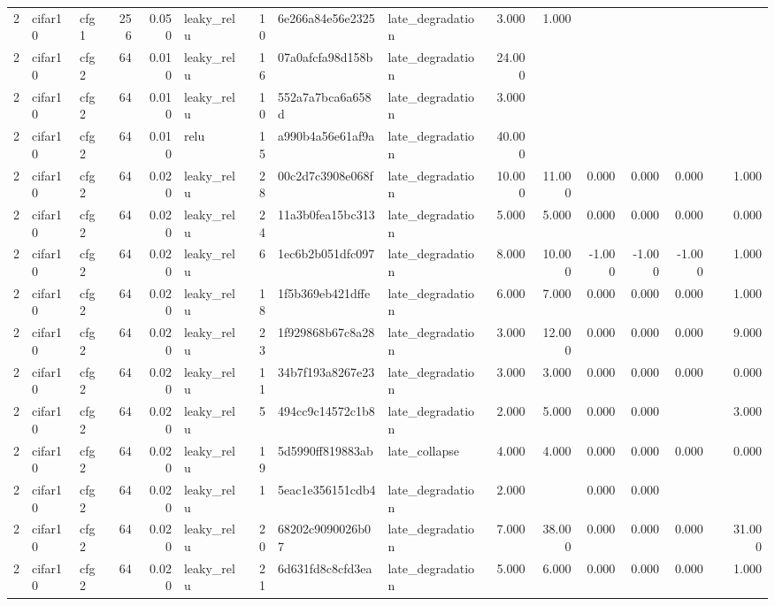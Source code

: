 \begin{table}[htbp]
{\begin{tabular}{@{}rllrrlrllrrrrrrr@{}}
2 & cifar10 & cfg1 & 256 & 0.050 & leaky\_relu & 10 & 6e266a84e56e2325 & late\_degradation & 3.000 & 1.000 &  &  &  &  &  \\
2 & cifar10 & cfg2 & 64 & 0.010 & leaky\_relu & 16 & 07a0afcfa98d158b & late\_degradation & 24.000 &  &  &  &  &  &  \\
2 & cifar10 & cfg2 & 64 & 0.010 & leaky\_relu & 10 & 552a7a7bca6a658d & late\_degradation & 3.000 &  &  &  &  &  &  \\
2 & cifar10 & cfg2 & 64 & 0.010 & relu & 15 & a990b4a56e61af9a & late\_degradation & 40.000 &  &  &  &  &  &  \\
2 & cifar10 & cfg2 & 64 & 0.020 & leaky\_relu & 28 & 00c2d7c3908e068f & late\_degradation & 10.000 & 11.000 & 0.000 & 0.000 & 0.000 &  & 1.000 \\
2 & cifar10 & cfg2 & 64 & 0.020 & leaky\_relu & 24 & 11a3b0fea15bc313 & late\_degradation & 5.000 & 5.000 & 0.000 & 0.000 & 0.000 &  & 0.000 \\
2 & cifar10 & cfg2 & 64 & 0.020 & leaky\_relu & 6 & 1ec6b2b051dfc097 & late\_degradation & 8.000 & 10.000 & -1.000 & -1.000 & -1.000 &  & 1.000 \\
2 & cifar10 & cfg2 & 64 & 0.020 & leaky\_relu & 18 & 1f5b369eb421dffe & late\_degradation & 6.000 & 7.000 & 0.000 & 0.000 & 0.000 &  & 1.000 \\
2 & cifar10 & cfg2 & 64 & 0.020 & leaky\_relu & 23 & 1f929868b67c8a28 & late\_degradation & 3.000 & 12.000 & 0.000 & 0.000 & 0.000 &  & 9.000 \\
2 & cifar10 & cfg2 & 64 & 0.020 & leaky\_relu & 11 & 34b7f193a8267e23 & late\_degradation & 3.000 & 3.000 & 0.000 & 0.000 & 0.000 &  & 0.000 \\
2 & cifar10 & cfg2 & 64 & 0.020 & leaky\_relu & 5 & 494cc9c14572c1b8 & late\_degradation & 2.000 & 5.000 & 0.000 & 0.000 &  &  & 3.000 \\
2 & cifar10 & cfg2 & 64 & 0.020 & leaky\_relu & 19 & 5d5990ff819883ab & late\_collapse & 4.000 & 4.000 & 0.000 & 0.000 & 0.000 &  & 0.000 \\
2 & cifar10 & cfg2 & 64 & 0.020 & leaky\_relu & 1 & 5eac1e356151cdb4 & late\_degradation & 2.000 &  & 0.000 & 0.000 &  &  &  \\
2 & cifar10 & cfg2 & 64 & 0.020 & leaky\_relu & 20 & 68202c9090026b07 & late\_degradation & 7.000 & 38.000 & 0.000 & 0.000 & 0.000 &  & 31.000 \\
2 & cifar10 & cfg2 & 64 & 0.020 & leaky\_relu & 21 & 6d631fd8c8cfd3ea & late\_degradation & 5.000 & 6.000 & 0.000 & 0.000 & 0.000 &  & 1.000 \\

\end{tabular}}
\end{table}
